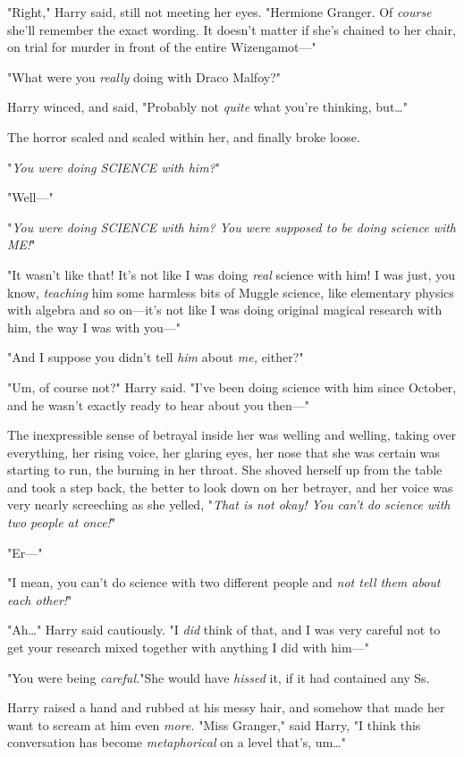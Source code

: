 "Right," Harry said, still not meeting her eyes. "Hermione Granger. Of 
\emph{course} she'll remember the exact wording. It doesn't matter if she's 
chained to her chair, on trial for murder in front of the entire Wizengamot---"

"What were you \emph{really} doing with Draco Malfoy?"

Harry winced, and said, "Probably not \emph{quite} what you're thinking, 
but{\ldots}"

The horror scaled and scaled within her, and finally broke loose.

"\emph{You were doing SCIENCE with him?}"

"Well---"

"\emph{You were doing SCIENCE with him? You were supposed to be doing science 
with ME!}"

"It wasn't like that! It's not like I was doing \emph{real} science with him! I 
was just, you know, \emph{teaching} him some harmless bits of Muggle science, 
like elementary physics with algebra and so on---it's not like I was doing 
original magical research with him, the way I was with you---"

"And I suppose you didn't tell \emph{him} about \emph{me,} either?"

"Um, of course not?" Harry said. "I've been doing science with him since 
October, and he wasn't exactly ready to hear about you then---"

The inexpressible sense of betrayal inside her was welling and welling, taking 
over everything, her rising voice, her glaring eyes, her nose that she was 
certain was starting to run, the burning in her throat. She shoved herself up 
from the table and took a step back, the better to look down on her betrayer, 
and her voice was very nearly screeching as she yelled, "\emph{That is not 
okay! You can't do science with two people at once!}"

"Er---"

"I mean, you can't do science with two different people and \emph{not tell them 
about each other!}"

"Ah{\ldots}" Harry said cautiously. "I \emph{did} think of that, and I was very 
careful not to get your research mixed together with anything I did with him---"

"You were being \emph{careful.}"She would have \emph{hissed} it, if it had 
contained any Ss.

Harry raised a hand and rubbed at his messy hair, and somehow that made her 
want to scream at him even \emph{more.} "Miss Granger," said Harry, "I think 
this conversation has become \emph{metaphorical} on a level that's, um{\ldots}"

